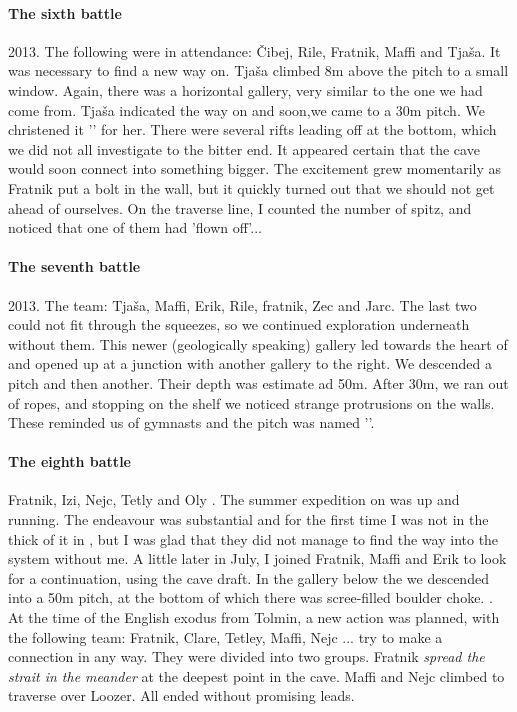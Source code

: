 \paragraph {The sixth battle} 2013. The following were in attendance: Čibej, Rile, Fratnik, Maffi and Tjaša. It was necessary to find a new way on. Tjaša climbed 8m above the  pitch to a small window. Again, there was a horizontal gallery, very similar to the one we had come from. Tjaša indicated the way on and soon,we came to a 30m pitch. We christened it '' for her. There were several rifts leading off at the bottom, which we did not all investigate to the bitter end. It appeared certain that the cave would soon connect into something bigger. The excitement grew momentarily as Fratnik put a bolt in the wall, but it quickly turned out that we should not get ahead of ourselves. On the traverse line, I counted the number of spitz, and noticed that one of them had 'flown off'...

\paragraph{The seventh battle} 2013. The team: Tjaša, Maffi, Erik, Rile, fratnik, Zec and Jarc. The last two could not fit through the squeezes, so we continued exploration underneath  without them. This newer (geologically speaking) gallery led towards the heart of  and opened up at a junction with another gallery to the right. We descended a pitch and then another. Their depth was estimate ad 50m. After 30m, we ran out of ropes, and stopping on the shelf we noticed strange protrusions on the walls. These reminded us of gymnasts and the pitch was named ''.

\paragraph{The eighth battle} Fratnik, Izi, Nejc, Tetly and Oly . The summer expedition on  was up and running. The endeavour was substantial and for the first time I was not in the thick of it in , but I was glad that they did not manage to find the way into the system without me. A little later in July, I joined Fratnik, Maffi and Erik to look for a continuation, using the cave draft. In the gallery below the  we descended into a 50m pitch, at the bottom of which there was scree-filled boulder choke. . At the time of the English exodus from Tolmin, a new action was planned, with the following team: Fratnik, Clare, Tetley, Maffi, Nejc ... try to make a connection in any way. They were divided into two groups. Fratnik \textit{spread the strait in the meander} at the deepest point in the cave. Maffi and Nejc climbed to traverse over Loozer. All ended without promising leads.

